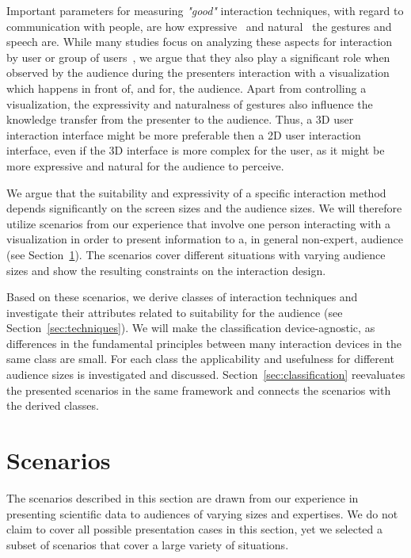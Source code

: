 \documentclass[review,journal]{vgtc}         %
\begin{document}
Important parameters for measuring \emph{"good"} interaction techniques, with regard to communication with people, are how expressive~\cite{Brewster:2009:MIE:2227763.2227769} and natural~\cite{O'hara:2013:NTP:2442106.2442111} the gestures and speech are.
While many studies focus on analyzing these aspects for interaction by user or group of users~\cite{978-3-642-12552-2, Caridakis:2013:NIE:2504335.2504378}, we argue that they also play a significant role when observed by the audience during the presenters interaction with a visualization which happens in front of, and for, the audience.
Apart from controlling a visualization, the expressivity and naturalness of gestures also influence the knowledge transfer from the presenter to the audience. Thus, a 3D user interaction interface might be more preferable then a 2D user interaction interface, even if the 3D interface is more complex for the user, as it might be more expressive and natural for the audience to perceive.

We argue that the suitability and expressivity of a specific interaction method depends significantly on the screen sizes and the audience sizes.
We will therefore utilize scenarios from our experience that involve one person interacting with a visualization in order to present information to a, in general non-expert, audience (see Section~\ref{sec:scenario}).
The scenarios cover different situations with varying audience sizes and show the resulting constraints on the interaction design.

Based on these scenarios, we derive classes of interaction techniques and investigate their attributes related to suitability for the audience (see Section~\ref{sec:techniques}).
We will make the classification device-agnostic, as differences in the fundamental principles between many interaction devices in the same class are small.
For each class the applicability and usefulness for different audience sizes is investigated and discussed.
Section~\ref{sec:classification} reevaluates the presented scenarios in the same framework and connects the scenarios with the derived classes.

%
%
%
\section{Scenarios} \label{sec:scenario}
The scenarios described in this section are drawn from our experience in presenting scientific data to audiences of varying sizes and expertises.
We do not claim to cover all possible presentation cases in this section, yet we selected a subset of scenarios that cover a large variety of situations.
\end{document}
